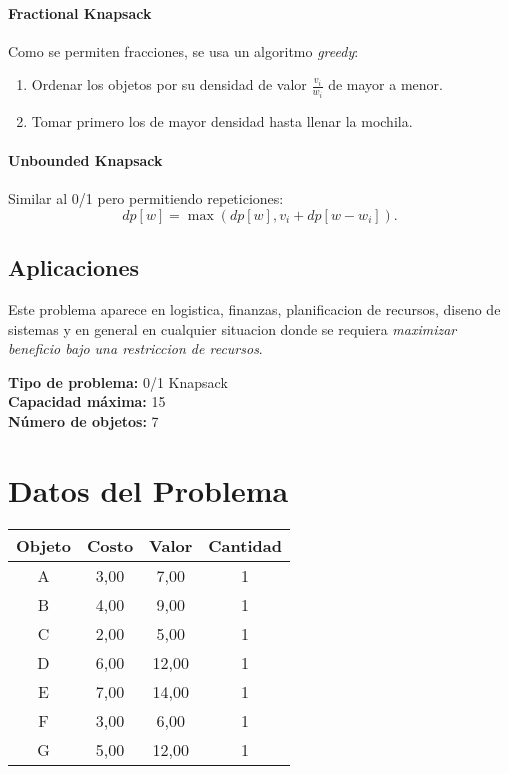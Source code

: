 \documentclass{article}
\begin{document}
\paragraph{Fractional Knapsack} Como se permiten fracciones, se usa un algoritmo \textit{greedy}:
\begin{enumerate}
  \item Ordenar los objetos por su densidad de valor $\frac{v_i}{w_i}$ de mayor a menor.
  \item Tomar primero los de mayor densidad hasta llenar la mochila.
\end{enumerate}

\paragraph{Unbounded Knapsack} Similar al 0/1 pero permitiendo repeticiones:
\[
dp[w] = \max ( dp[w], v_i + dp[w - w_i] ).
\]

\subsection{Aplicaciones}
Este problema aparece en logistica, finanzas, planificacion de recursos, diseno de sistemas y en general en cualquier situacion donde se requiera \textit{maximizar beneficio bajo una restriccion de recursos}.

\thispagestyle{empty}
\newpage
\textbf{Tipo de problema:} 0/1 Knapsack\\
\textbf{Capacidad máxima:} 15\\
\textbf{Número de objetos:} 7\\

\clearpage
\section*{Datos del Problema}
\begin{tabular}{|c|c|c|c|}
\hline
Objeto & Costo & Valor & Cantidad \\
\hline
A & 3,00 & 7,00 & 1 \\
B & 4,00 & 9,00 & 1 \\
C & 2,00 & 5,00 & 1 \\
D & 6,00 & 12,00 & 1 \\
E & 7,00 & 14,00 & 1 \\
F & 3,00 & 6,00 & 1 \\
G & 5,00 & 12,00 & 1 \\
\hline
\end{tabular}
\end{document}
